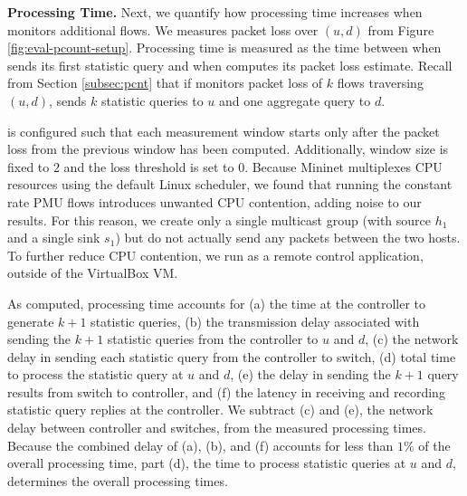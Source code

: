 {\bf Processing Time.}
Next, we quantify how \pcnt processing time increases when \pcnt monitors additional flows.  We measures packet loss over $(u,d)$ from Figure \ref{fig:eval-pcount-setup}.
Processing time is measured as the time between when \pcnt sends its first statistic query and when \pcnt computes its packet loss estimate. Recall from Section \ref{subsec:pcnt} 
that if \pcnt monitors packet loss of $k$ flows traversing $(u,d)$, \pcnt sends $k$ statistic queries to $u$ and one aggregate query to $d$. 

\pcnt is configured such that each measurement window starts only after the packet loss from the previous window has been computed. Additionally, \pcnt window size is fixed to $2$ and 
the loss threshold is set to $0$.
Because Mininet multiplexes CPU resources using the default Linux scheduler, we found that running the constant rate PMU flows introduces unwanted CPU contention, adding noise to 
our results.  For this reason, we create only a single multicast group (with source $h_1$ and a single sink $s_1$) 
but do not actually send any packets between the two hosts. To further reduce CPU contention, we run \pcnt as a remote control application, outside of the VirtualBox VM.

As computed, processing time accounts for (a) the time at the controller
to generate $k+1$ statistic queries, (b) the transmission delay associated with sending the $k+1$ statistic queries from the controller to $u$ and $d$, 
(c) the network delay in sending each statistic query from the controller to switch, (d) total time to process the statistic query at $u$ and $d$, (e) the delay in sending the $k+1$ query results
from switch to controller, and (f) the latency in receiving and recording statistic query replies at the controller. %
We subtract (c) and (e), the network delay between controller and switches, from the measured processing times.  Because the combined delay of (a), (b), and (f) accounts for less
than $1\%$ of the overall processing time, part (d), the time to process statistic queries at $u$ and $d$, determines the overall processing times.



